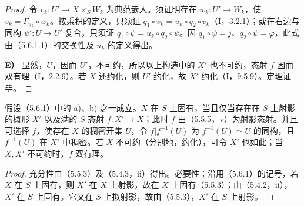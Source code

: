 \begin{proof}
令 $v_k:U'\to X\times_S W_k$ 为典范嵌入。须证明存在 $w_k:U'\to W_k$，使
$v_k=\Gamma_{u_k}\circ w_k$。按乘积的定义，只须证
$q_1\circ v_k=u_k\circ q_2\circ v_k$（I，3.2.1）；或在右边与同构 $\psi':U\to U'$ 复合，只须证
$q_1\circ\psi=u_k\circ q_2\circ\psi$。因 $q_1\circ\psi=j$、$q_2\circ\psi=\varphi$，此式由（5.6.1.1）的交换性及 $u_k$ 的定义得出。

\textbf{E）} 显然，$U$，因而 $U'$，不可约，所以以上构造中的 $X'$ 也不可约，态射 $f$ 因而双有理（I，2.2.9）。若 $X$ 还约化，则 $U'$ 约化，故 $X'$ 约化（I，9.5.9）。定理证毕。
\end{proof}

假设（5.6.1）中的 a)、b) 之一成立。$X$ 在 $S$ 上固有，当且仅当存在在 $S$ 上射影的概形 $X'$ 以及满的 $S$-态射 $f:X'\to X$；此时 $f$ 由（5.5.5，v）为射影态射。并且可选择 $f$，使存在 $X$ 的稠密开集 $U$，令 $f|f^{-1}(U)$ 为 $f^{-1}(U)\simeq U$ 的同构，且 $f^{-1}(U)$ 在 $X'$ 中稠密。若 $X$ 不可约（分别地，约化），可令 $X'$ 也如此；当 $X,X'$ 不可约时，$f$ 双有理。
\begin{proof}
充分性由（5.5.3）及（5.4.3，ii）得出。必要性：沿用（5.6.1）的记号，若 $X$ 在 $S$ 上固有，则 $X'$ 在 $X$ 上射影，故在 $X$ 上固有（5.5.3）；由（5.4.2，ii），$X'$ 在 $S$ 上固有。它又在 $S$ 上拟射影，故由（5.5.3），$X'$ 在 $S$ 上射影。
\end{proof}

